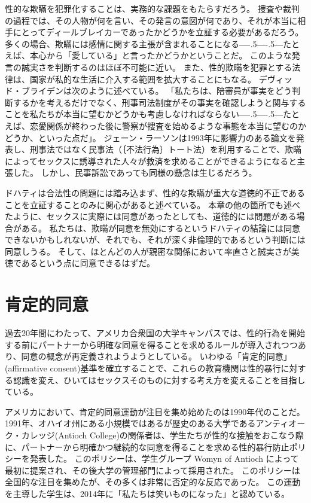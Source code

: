 \documentclass[paper=a4,book,openany]{jlreq}
\def\DDASH{―\kern-.5\zw―\kern-.5\zw―} %
\begin{document}
性的な欺瞞を犯罪化することは、実務的な課題をもたらすだろう。
捜査や裁判の過程では、その人物が何を言い、その発言の意図が何であり、それが本当に相手にとってディールブレイカーであったかどうかを立証する必要があるだろう。
多くの場合、欺瞞には感情に関する主張が含まれることになる{\DDASH}たとえば、本心から「愛している」と言ったかどうかということだ。
このような発言の誠実さを判断するのはほぼ不可能に近い。
また、性的欺瞞を犯罪とする法律は、国家が私的な生活に介入する範囲を拡大することにもなる。
デヴィッド・ブライデンは次のように述べている。
「私たちは、陪審員が事実をどう判断するかを考えるだけでなく、刑事司法制度がその事実を確認しようと関与することを私たちが本当に望むかどうかも考慮しなければならない{\DDASH}たとえば、恋愛関係が終わった後に警察が捜査を始めるような事態を本当に望むのかどうか、といった点だ」\citep[p.469]{bryden00:_redef_rape}。
ジェーン・ラーソンは1993年に影響力のある論文を発表し、刑事法ではなく民事法（｛不法行為｝{トート}法）を利用することで、欺瞞によってセックスに誘導された人々が救済を求めることができるようになると主張した\citep{larson93:_women_under_so_littl_they}。
しかし、民事訴訟であっても同様の懸念は生じるだろう。

ドハティは合法性の問題には踏み込まず、性的な欺瞞が重大な道徳的不正であることを立証することのみに関心があると述べている。
本章の他の箇所でも述べたように、セックスに実際には同意があったとしても、道徳的には問題がある場合がある。
私たちは、欺瞞が同意を無効にするというドハティの結論には同意できないかもしれないが、それでも、それが深く非倫理的であるという判断には同意しうる。
そして、ほとんどの人が親密な関係において率直さと誠実さが美徳であるという点に同意できるはずだ。

\section{肯定的同意}

過去20年間にわたって、アメリカ合衆国の大学キャンパスでは、性的行為を開始する前にパートナーから明確な同意を得ることを求めるルールが導入されつつあり、同意の概念が再定義されようようとしている。
いわゆる「肯定的同意」(affirmative consent)基準を確立することで、これらの教育機関は性的暴行に対する認識を変え、ひいてはセックスそのものに対する考え方を変えることを目指している。

アメリカにおいて、肯定的同意運動が注目を集め始めたのは1990年代のことだ。
1991年、オハイオ州にある小規模ではあるが歴史のある大学であるアンティオーク・カレッジ(Antioch College)の関係者は、学生たちが性的な接触をおこなう際に、パートナーから明確かつ継続的な同意を得ることを求める性的暴行防止ポリシーを発表した。
このポリシーは、学生グループ Womyn of Antioch によって最初に提案され、その後大学の管理部門によって採用された。
このポリシーは全国的な注目を集めたが、その多くは非常に否定的な反応であった。
この運動を主導した学生は、2014年に「私たちは笑いものになった」と認めている\citep{saltman14:_we_start_crusad_affir_consen}。
\end{document}
